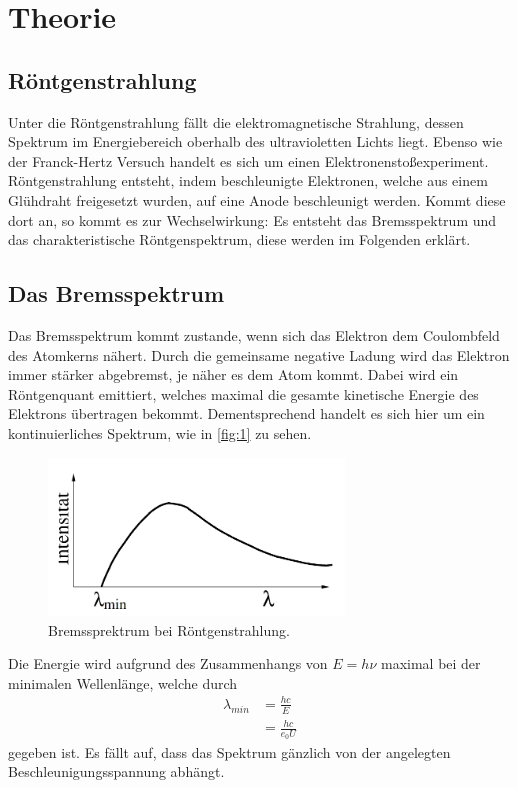 \section{Theorie}
\label{sec:Theorie}

\subsection{Röntgenstrahlung}
Unter die Röntgenstrahlung fällt die elektromagnetische Strahlung, dessen 
Spektrum im Energiebereich oberhalb des ultravioletten Lichts liegt.
Ebenso wie der Franck-Hertz Versuch handelt es sich um einen Elektronenstoßexperiment.
Röntgenstrahlung entsteht, indem beschleunigte Elektronen, welche aus einem 
Glühdraht freigesetzt wurden, auf eine Anode beschleunigt werden. Kommt diese 
dort an, so kommt es zur Wechselwirkung: Es entsteht das Bremsspektrum und 
das charakteristische Röntgenspektrum, diese werden im Folgenden erklärt.

\subsection{Das Bremsspektrum}
Das Bremsspektrum kommt zustande, wenn sich das Elektron dem Coulombfeld des 
Atomkerns nähert. Durch die gemeinsame negative Ladung wird das Elektron 
immer stärker abgebremst, je näher es dem Atom kommt. Dabei wird ein Röntgenquant 
emittiert, welches maximal die gesamte kinetische Energie des Elektrons übertragen
bekommt. Dementsprechend handelt es sich hier um ein kontinuierliches Spektrum,
wie in \autoref{fig:1} zu sehen.
\begin{figure}[H]
    \centering
        \centering
        \includegraphics[width=0.7\textwidth]{bilder/brems.png}
        \caption{Bremssprektrum bei Röntgenstrahlung. \cite{anleitung10}}
    \hfill
    \label{fig:1}
\end{figure}
\noindent Die Energie wird aufgrund des Zusammenhangs von $E=h \nu$ maximal bei
der minimalen Wellenlänge, welche durch 
\begin{align}
    \label{eqn:E}
    \lambda_{min} &= \frac{h c}{E} \\
                  &= \frac{h c}{e_0 U}
\end{align}
gegeben ist. Es fällt auf, dass das Spektrum gänzlich von der angelegten 
Beschleunigungsspannung abhängt.

